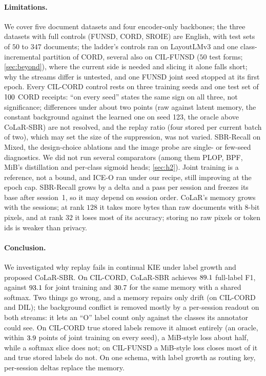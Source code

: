 \documentclass[10pt,twocolumn,letterpaper]{article}
\begin{document}
\paragraph{Limitations.} We cover five document datasets and four encoder-only backbones; the three datasets with full controls (FUNSD, CORD, SROIE) are English, with test sets of $50$ to $347$ documents; the ladder's controls ran on LayoutLMv3 and one class-incremental partition of CORD, several also on CIL-FUNSD ($50$ test forms; \cref{sec:beyond}), where the current side is needed and slicing it alone falls short; why the streams differ is untested, and one FUNSD joint seed stopped at its first epoch. Every CIL-CORD control rests on three training seeds and one test set of $100$ CORD receipts: ``on every seed'' states the same sign on all three, not significance; differences under about two points (raw against latent memory, the constant background against the learned one on seed 123, the oracle above CoLaR-SBR) are not resolved, and the replay ratio (four stored per current batch of two), which may set the size of the suppression, was not varied. SBR-Recall on Mixed, the design-choice ablations and the image probe are single- or few-seed diagnostics. We did not run several comparators (among them PLOP, BPF, MiB's distillation and per-class sigmoid heads; \cref{sec:h2}). Joint training is a reference, not a bound, and ICE-O ran under our recipe, still improving at the epoch cap. SBR-Recall grows by a delta and a pass per session and freezes its base after session~1, so it may depend on session order. CoLaR's memory grows with the sessions; at rank $128$ it takes more bytes than raw documents with 8-bit pixels, and at rank $32$ it loses most of its accuracy; storing no raw pixels or token ids is weaker than privacy.

\paragraph{Conclusion.} We investigated why replay fails in continual KIE under label growth and proposed CoLaR-SBR. On CIL-CORD, CoLaR-SBR achieves $89.1$ full-label F1, against $93.1$ for joint training and $30.7$ for the same memory with a shared softmax. Two things go wrong, and a memory repairs only drift (on CIL-CORD and DIL); the background conflict is removed mostly by a per-session readout on both streams: it lets an ``O'' label count only against the classes its annotator could see. On CIL-CORD true stored labels remove it almost entirely (an oracle, within $3.9$ points of joint training on every seed), a MiB-style loss about half, while a softmax slice does not; on CIL-FUNSD a MiB-style loss closes most of it and true stored labels do not. On one schema, with label growth as routing key, per-session deltas replace the memory.\label{mainend}%
\end{document}
